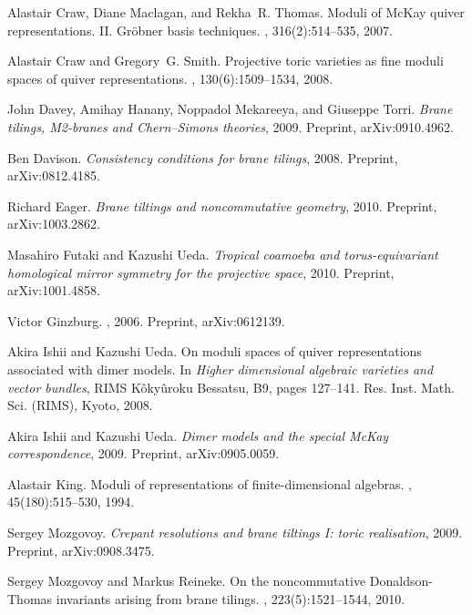 \documentclass[11pt,a4paper]{amsart}
\numberwithin{equation}{section}
\theoremstyle{definition}
\theoremstyle{remark}
\begin{document}
\begin{thebibliography}{10}
Alastair Craw, Diane Maclagan, and Rekha~R. Thomas.
\newblock Moduli of {M}c{K}ay quiver representations. {II}. {G}r\"obner basis
  techniques.
, 316(2):514--535, 2007.

Alastair Craw and Gregory~G. Smith.
\newblock Projective toric varieties as fine moduli spaces of quiver
  representations.
, 130(6):1509--1534, 2008.

John Davey, Amihay Hanany, Noppadol Mekareeya, and Giuseppe Torri.
\newblock \emph{Brane tilings, {M}2-branes and {C}hern--{S}imons theories},
  2009.
\newblock Preprint, arXiv:0910.4962.

Ben Davison.
\newblock \emph{Consistency conditions for brane tilings}, 2008.
\newblock Preprint, arXiv:0812.4185.

Richard Eager.
\newblock \emph{Brane tiltings and noncommutative geometry}, 2010.
\newblock Preprint, arXiv:1003.2862.

Masahiro Futaki and Kazushi Ueda.
\newblock \emph{Tropical coamoeba and torus-equivariant homological mirror
  symmetry for the projective space}, 2010.
\newblock Preprint, arXiv:1001.4858.

Victor {Ginzburg}.
, 2006.
\newblock Preprint, arXiv:0612139.

Akira Ishii and Kazushi Ueda.
\newblock On moduli spaces of quiver representations associated with dimer
  models.
\newblock In {\em Higher dimensional algebraic varieties and vector bundles},
  RIMS K\^oky\^uroku Bessatsu, B9, pages 127--141. Res. Inst. Math. Sci.
  (RIMS), Kyoto, 2008.

Akira Ishii and Kazushi Ueda.
\newblock \emph{Dimer models and the special {M}c{K}ay correspondence}, 2009.
\newblock Preprint, arXiv:0905.0059.

Alastair King.
\newblock Moduli of representations of finite-dimensional algebras.
, 45(180):515--530, 1994.

Sergey Mozgovoy.
\newblock \emph{Crepant resolutions and brane tiltings I: toric realisation},
  2009.
\newblock Preprint, arXiv:0908.3475.

Sergey Mozgovoy and Markus Reineke.
\newblock On the noncommutative {D}onaldson-{T}homas invariants arising from
  brane tilings.
, 223(5):1521--1544, 2010.


\end{thebibliography}
\end{document}
